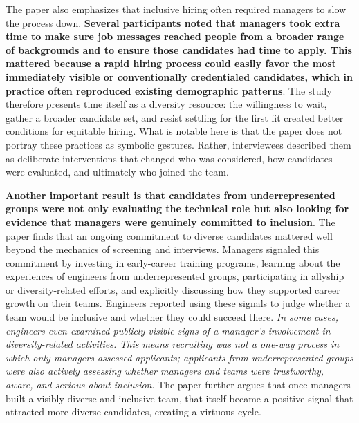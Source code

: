 The paper also emphasizes that inclusive hiring often required managers to slow the process down. \textbf{Several participants noted that managers took extra time to make sure job messages reached people from a broader range of backgrounds and to ensure those candidates had time to apply. This mattered because a rapid hiring process could easily favor the most immediately visible or conventionally credentialed candidates, which in practice often reproduced existing demographic patterns}. The study therefore presents time itself as a diversity resource: the willingness to wait, gather a broader candidate set, and resist settling for the first fit created better conditions for equitable hiring. What is notable here is that the paper does not portray these practices as symbolic gestures. Rather, interviewees described them as deliberate interventions that changed who was considered, how candidates were evaluated, and ultimately who joined the team.

\textbf{Another important result is that candidates from underrepresented groups were not only evaluating the technical role but also looking for evidence that managers were genuinely committed to inclusion}. The paper finds that an ongoing commitment to diverse candidates mattered well beyond the mechanics of screening and interviews. Managers signaled this commitment by investing in early-career training programs, learning about the experiences of engineers from underrepresented groups, participating in allyship or diversity-related efforts, and explicitly discussing how they supported career growth on their teams. Engineers reported using these signals to judge whether a team would be inclusive and whether they could succeed there. \textit{In some cases, engineers even examined publicly visible signs of a manager's involvement in diversity-related activities. This means recruiting was not a one-way process in which only managers assessed applicants; applicants from underrepresented groups were also actively assessing whether managers and teams were trustworthy, aware, and serious about inclusion}. The paper further argues that once managers built a visibly diverse and inclusive team, that itself became a positive signal that attracted more diverse candidates, creating a virtuous cycle.

